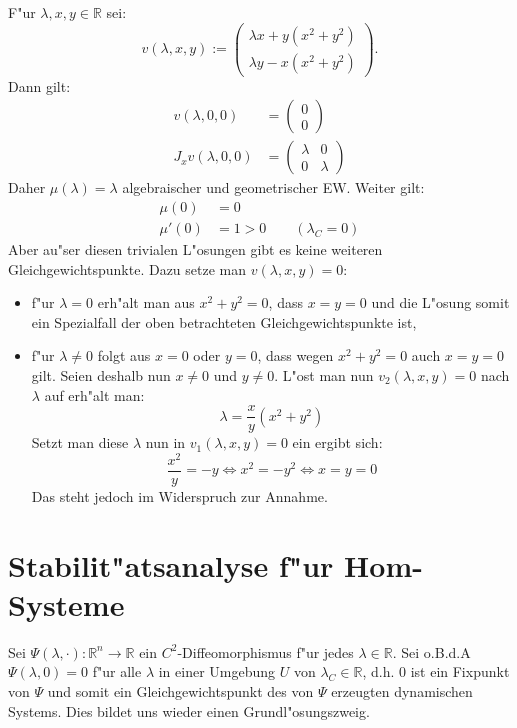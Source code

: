 \documentclass[a4paper, 13pt]{scrreprt}
\theoremstyle{definition} \newtheorem{definition}{Definition}[section]
\newenvironment{beispiel}[1][Beispiel]{\begin{trivlist}
\item[\hskip \labelsep {\bfseries #1}]}{\end{trivlist}}
\newcommand{\RR}{\mathbb{R}}
\begin{document}
\begin{beispiel}
F"ur $\lambda,x,y\in\RR$ sei:
\[
v(\lambda,x,y):=\begin{pmatrix}
\lambda x + y(x^2+y^2)\\
\lambda y - x(x^2+y^2)
\end{pmatrix}.
\]
Dann gilt:
\begin{align*}
v(\lambda,0,0) &= \begin{pmatrix}
0\\
0
\end{pmatrix}\\
J_xv(\lambda,0,0) &= \left(\begin{array}{cc}
\lambda & 0\\
0 & \lambda
\end{array}\right)
\end{align*}
Daher $\mu(\lambda) = \lambda$ algebraischer und geometrischer EW. Weiter gilt:
\begin{align*}
\mu(0) &= 0\\
\mu'(0) &= 1 > 0\qquad (\lambda_C = 0)
\end{align*}
Aber au"ser diesen trivialen L"osungen gibt es keine weiteren Gleichgewichtspunkte. Dazu setze man $v(\lambda,x,y) = 0$:
\begin{itemize}
\item
f"ur $\lambda = 0$ erh"alt man aus $x^2+y^2 = 0$, dass $x = y = 0$ und die L"osung somit ein Spezialfall der oben betrachteten Gleichgewichtspunkte ist,

\item
f"ur $\lambda\neq 0$ folgt aus $x = 0$ oder $y = 0$, dass wegen $x^2+y^2 = 0$ auch $x = y = 0$ gilt. Seien deshalb nun $x\neq 0$ und $y\neq 0$. L"ost man nun $v_2(\lambda,x,y)=0$ nach $\lambda$ auf erh"alt man:
\[\lambda = \frac{x}{y}(x^2+y^2)\]
Setzt man diese $\lambda$ nun in $v_1(\lambda,x,y)=0$ ein ergibt sich:
\[
\frac{x^2}{y} = -y \Leftrightarrow x^2 = -y^2 \Leftrightarrow x = y = 0
\]
Das steht jedoch im Widerspruch zur Annahme.
\end{itemize}
\end{beispiel}


\section{Stabilit"atsanalyse f"ur Hom-Systeme}

Sei $\Psi(\lambda,\cdot)\colon\mathbb{R}^n\to\mathbb{R}$ ein $C^2$-Diffeomorphismus f"ur jedes $\lambda\in\mathbb{R}$. 
Sei o.B.d.A $\Psi(\lambda,0)=0$ f"ur alle $\lambda$ in einer Umgebung $U$ von $\lambda_C\in\RR$, d.h. $0$ ist ein Fixpunkt von $\Psi$ und somit ein Gleichgewichtspunkt des von $\Psi$ erzeugten dynamischen Systems. Dies bildet uns wieder einen Grundl"osungszweig.
\end{document}
